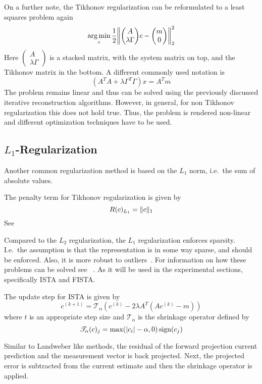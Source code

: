 On a further note, the Tikhonov regularization can be reformulated to a least squares problem again
\[
	\argmin_c \frac{1}{2}
	\left\lVert
	\begin{pmatrix}
		A \\
		\lambda \Gamma
	\end{pmatrix}
	c -
	\begin{pmatrix}
		m \\
		0
	\end{pmatrix}
	\right\rVert_2^2
\]
Here \(\begin{pmatrix}
	A \\
	\lambda \Gamma
\end{pmatrix}\) is a stacked matrix, with the system matrix on top, and the Tikhonov matrix in the
bottom. A different commonly used notation is
\[
	(A^T A + \lambda \Gamma^T \Gamma)x = A^T m
\]
The problem remains linear and thus can be solved using the previously discussed iterative
reconstruction algorithms. However, in general, for non Tikhonov regularization this does not hold
true. Thus, the problem is rendered non-linear and different optimization techniques have to be
used.

\subsection{\(L_1\)-Regularization}\label{subsec:l1_regularization}

Another common regularization method is based on the \(L_1\) norm, i.e.\ the sum of absolute
values.
\begin{definition}[\(L_1\)-Regularization]\label{def:l1_regularization}
	The penalty term for Tikhonov regularization is given by
	\[
		R(c)_{L_1} = \lVert c\rVert_1
	\]
	See~\cite{tibshirani_regression_1996,tibshirani_lasso_2013,beck_fast_2009}
\end{definition}
Compared to the \(L_2\) regularization, the \(L_1\) regularization enforces sparsity. I.e.\ the
assumption is that the representation is in some way sparse, and should be enforced. Also, it is
more robust to outliers~\cite{beck_fast_2009}. For information on how these problems can be solved
see \citeauthor{beck_fast_2009}~\cite{beck_fast_2009}. As it will be used in the experimental
sections, specifically \gls{ISTA} and  \gls{FISTA}.

\begin{definition}[ISTA]\label{def:ista}
	The update step for \gls{ISTA} is given by
	\[
		c^{(k+1)} = \mathscr{T_\alpha} (c^{(k)} - 2 \lambda A^T (A c^{(k)} - m))
	\]
	where \(t\) is an appropriate step size and \(\mathscr{T_\alpha}\) is the shrinkage operator
	defined by
	\[
		\mathscr{T_\alpha}(c)_j = \max(\lvert c_i\rvert - \alpha, 0) \operatorname{sign}(c_j)
	\]
\end{definition}
Similar to Landweber like methods, the residual of the forward projection current prediction and the
measurement vector is back projected. Next, the projected error is subtracted from the current
estimate and then the shrinkage operator is applied.

